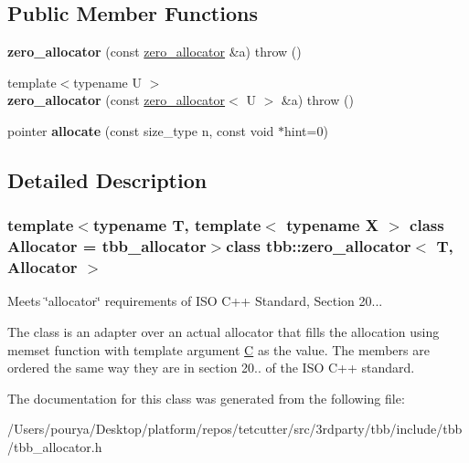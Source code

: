 \subsection*{Public Member Functions}
\begin{DoxyCompactItemize}
\item 
\hypertarget{classtbb_1_1zero__allocator_a9080a874dd20d0ca8e404683113990f2}{}{\bfseries zero\+\_\+allocator} (const \hyperlink{classtbb_1_1zero__allocator}{zero\+\_\+allocator} \&a)  throw ()\label{classtbb_1_1zero__allocator_a9080a874dd20d0ca8e404683113990f2}

\item 
\hypertarget{classtbb_1_1zero__allocator_ab417c217e597c6f412c5a630ba18bc32}{}{\footnotesize template$<$typename U $>$ }\\{\bfseries zero\+\_\+allocator} (const \hyperlink{classtbb_1_1zero__allocator}{zero\+\_\+allocator}$<$ U $>$ \&a)  throw ()\label{classtbb_1_1zero__allocator_ab417c217e597c6f412c5a630ba18bc32}

\item 
\hypertarget{classtbb_1_1zero__allocator_a1b9fe1273c2332e3c0b571d7bf1ba615}{}pointer {\bfseries allocate} (const size\+\_\+type n, const void $\ast$hint=0)\label{classtbb_1_1zero__allocator_a1b9fe1273c2332e3c0b571d7bf1ba615}

\end{DoxyCompactItemize}


\subsection{Detailed Description}
\subsubsection*{template$<$typename T, template$<$ typename X $>$ class Allocator = tbb\+\_\+allocator$>$class tbb\+::zero\+\_\+allocator$<$ T, Allocator $>$}

Meets \char`\"{}allocator\char`\"{} requirements of I\+S\+O C++ Standard, Section 20... 

The class is an adapter over an actual allocator that fills the allocation using memset function with template argument \hyperlink{classC}{C} as the value. The members are ordered the same way they are in section 20.. of the I\+S\+O C++ standard. 

The documentation for this class was generated from the following file\+:\begin{DoxyCompactItemize}
\item 
/\+Users/pourya/\+Desktop/platform/repos/tetcutter/src/3rdparty/tbb/include/tbb/tbb\+\_\+allocator.\+h\end{DoxyCompactItemize}
